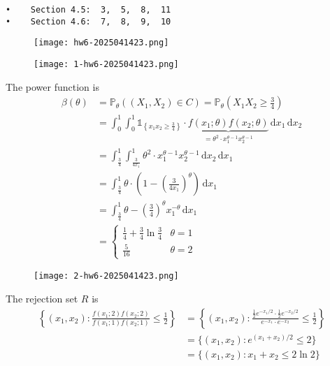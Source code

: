 \begin{lstlisting}
•    Section 4.5:  3,  5,  8,  11  
•    Section 4.6:  7,  8,  9,  10
\end{lstlisting}
\begin{exercise}
\begin{figure}[H]
\centering
\texttt{[image: hw6-2025041423.png]}
\label{}
\end{figure}
\begin{figure}[H]
\centering
\texttt{[image: 1-hw6-2025041423.png]}
\label{}
\end{figure}
\end{exercise}
The power function is
\[
\begin{aligned}
\beta(\theta) & =\mathbb{P}_{\theta}((X_1,X_2)\in C)=\mathbb{P}_{\theta}\left( X_1X_2\geq \frac{3}{4} \right) \\
 & =\int_{0}^{1} \int_{0}^{1} \mathbb{1}_{\left\{  x_1x_2\geq \frac{3}{4}  \right\}} \cdot \underbrace{ f(x_1;\theta)f(x_2;\theta) }_{ =\theta^{2}\cdot x_1^{\theta-1}x_2^{\theta-1} } \, \mathrm{d}x_1  \, \mathrm{d}x_2  \\
 & =\int_{\frac{3}{4}}^{1} \int_{\frac{3}{4x_1} }^{1} \theta^{2}\cdot x_1^{\theta-1}x_2^{\theta-1} \, \mathrm{d}x_2  \, \mathrm{d}x_1 \\
  & =\int_{\frac{3}{4}}^{1} \theta \cdot\left( 1-\left( \frac{3}{4x_1} \right)^{\theta} \right) \, \mathrm{d}x_1 \\
  & =\int_{\frac{3}{4}}^{1} \theta-\left( \frac{3}{4} \right)^{\theta}x_1^{-\theta} \, \mathrm{d}x_1  \\
 & =\begin{cases}
\frac{1}{4}+\frac{3}{4}\ln\frac{3}{4}  & \theta=1 \\
\frac{5}{16} & \theta=2  
\end{cases}
\end{aligned}
\]
\begin{exercise}
\begin{figure}[H]
\centering
\texttt{[image: 2-hw6-2025041423.png]}
\label{}
\end{figure}
\end{exercise}
The rejection set $R$ is
\[
\begin{aligned}
\left\{  (x_1,x_2):\frac{f(x_1;2)f(x_2;2)}{f(x_1;1)f(x_2;1)}\leq \frac{1}{2}  \right\} & =\left\{  (x_1,x_2):\frac{\frac{1}{2}e^{ -x_1/2 }\cdot\frac{1}{2}e^{ -x_2/2 }}{e^{ -x_1 }\cdot e^{ -x_2 }}\leq \frac{1}{2}  \right\} \\
 & =\{ (x_1,x_2):e^{ (x_1+x_2)/2 }\leq 2 \} \\
 & =\{ (x_1,x_2):x_1+x_2\leq 2\ln2 \}
\end{aligned}
\]
